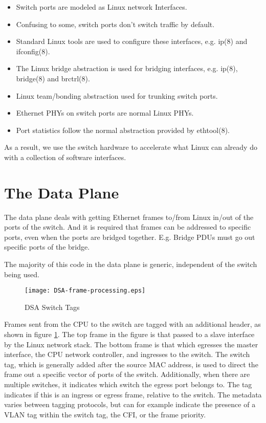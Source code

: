 \documentclass[letterpaper]{article}
\begin{document}
\begin{itemize}
\item Switch ports are modeled as Linux network Interfaces.
\item Confusing to some, switch ports don't switch traffic by default.
\item Standard Linux tools are used to configure these interfaces, e.g. ip(8) and ifconfig(8).
\item The Linux bridge abstraction is used for bridging interfaces, e.g. ip(8), bridge(8) and brctrl(8).
\item Linux team/bonding abstraction used for trunking switch ports.
\item Ethernet PHYs on switch ports are normal Linux PHYs.
\item Port statistics follow the normal abstraction provided by ethtool(8).
\end{itemize}

As a result, we use the switch hardware to accelerate what Linux can
already do with a collection of software interfaces.

\section{The Data Plane}

The data plane deals with getting Ethernet frames to/from Linux in/out
of the ports of the switch. And it is required that frames can be
addressed to specific ports, even when the ports are bridged together.
E.g. Bridge PDUs must go out specific ports of the bridge.

The majority of this code in the data plane is generic, independent of
the switch being used.

\begin{figure}[ht]
  \centering
  \texttt{[image: DSA-frame-processing.eps]}
  \caption{DSA Switch Tags}
  \label{DSA-frame-processing}
\end{figure}

Frames sent from the CPU to the switch are tagged with an additional
header, as shown in figure \ref{DSA-frame-processing}. The top frame
in the figure is that passed to a slave interface by the Linux network
stack. The bottom frame is that which egresses the master interface,
the CPU network controller, and ingresses to the switch. The switch
tag, which is generally added after the source MAC address, is used to
direct the frame out a specific vector of ports of the switch.
Additionally, when there are multiple switches, it indicates which
switch the egress port belongs to. The tag indicates if this is an
ingress or egress frame, relative to the switch. The metadata varies
between tagging protocols, but can for example indicate the presence
of a VLAN tag within the switch tag, the CFI, or the frame priority.
\end{document}
